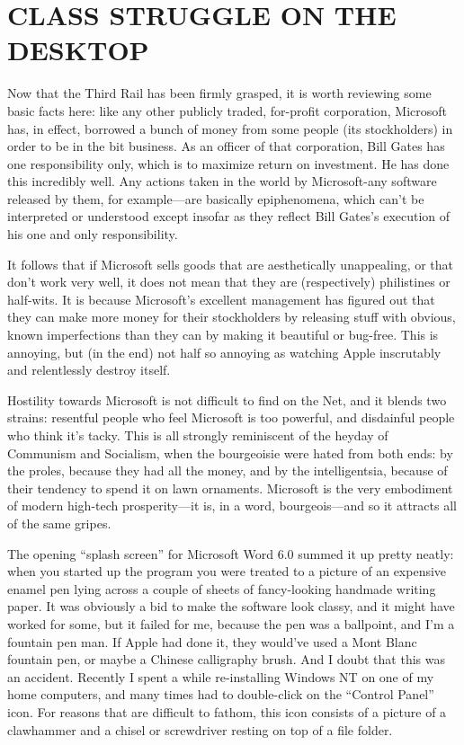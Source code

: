 \documentclass[
  fontsize=11pt,
  paper=landscape,
  twocolumn=true,
  pagesize=pdftex,
  headings=small,
  DIV=15,
  ]{scrartcl}
\begin{document}
\section{CLASS STRUGGLE ON THE DESKTOP}

Now that the Third Rail has been firmly grasped, it is worth reviewing
some basic facts here: like any other publicly traded, for-profit
corporation, Microsoft has, in effect, borrowed a bunch of money from
some people (its stockholders) in order to be in the bit business. As an
officer of that corporation, Bill Gates has one responsibility only,
which is to maximize return on investment. He has done this incredibly
well. Any actions taken in the world by Microsoft-any software released
by them, for example---are basically epiphenomena, which can't be
interpreted or understood except insofar as they reflect Bill Gates's
execution of his one and only responsibility.

It follows that if Microsoft sells goods that are aesthetically
unappealing, or that don't work very well, it does not mean that they
are (respectively) philistines or half-wits. It is because Microsoft's
excellent management has figured out that they can make more money for
their stockholders by releasing stuff with obvious, known imperfections
than they can by making it beautiful or bug-free. This is annoying, but
(in the end) not half so annoying as watching Apple inscrutably and
relentlessly destroy itself.

Hostility towards Microsoft is not difficult to find on the Net, and it
blends two strains: resentful people who feel Microsoft is too powerful,
and disdainful people who think it's tacky. This is all strongly
reminiscent of the heyday of Communism and Socialism, when the
bourgeoisie were hated from both ends: by the proles, because they had
all the money, and by the intelligentsia, because of their tendency to
spend it on lawn ornaments. Microsoft is the very embodiment of modern
high-tech prosperity---it is, in a word, bourgeois---and so it attracts
all of the same gripes.

The opening ``splash screen'' for Microsoft Word 6.0 summed it up pretty
neatly: when you started up the program you were treated to a picture of
an expensive enamel pen lying across a couple of sheets of fancy-looking
handmade writing paper. It was obviously a bid to make the software look
classy, and it might have worked for some, but it failed for me, because
the pen was a ballpoint, and I'm a fountain pen man. If Apple had done
it, they would've used a Mont Blanc fountain pen, or maybe a Chinese
calligraphy brush. And I doubt that this was an accident. Recently I
spent a while re-installing Windows NT on one of my home computers, and
many times had to double-click on the ``Control Panel'' icon. For
reasons that are difficult to fathom, this icon consists of a picture of
a clawhammer and a chisel or screwdriver resting on top of a file
folder.
\end{document}
